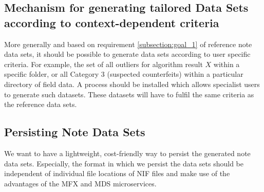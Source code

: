 \subsection{Mechanism for generating tailored Data Sets according to context-dependent criteria}

More generally and based on requirement \ref{subsection:goal_1} of reference note data sets, it should be possible to generate data sets according to user specific criteria. For example, the set of all outliers for algorithm result $X$ within a specific folder, or all Category 3 (suspected counterfeits) within a particular directory of field data.
A process should be installed which allows specialist users to generate such datasets. These datasets will have to fulfil the same criteria as the reference data sets.


\subsection{Persisting Note Data Sets}

We want to have a lightweight, cost-friendly way to persist the generated note data sets. Especially, the format in which we persist the data sets should be independent of individual file locations of NIF files and make use of the advantages of the MFX and MDS microservices.
